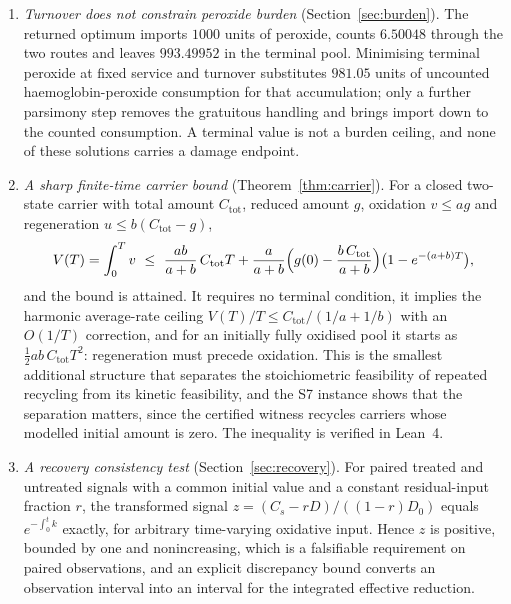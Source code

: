 \documentclass[11pt,a4paper]{article}
\theoremstyle{plain}
\theoremstyle{definition}
\theoremstyle{remark}
\newcommand{\Ctot}{C_{\mathrm{tot}}}
\begin{document}
\begin{enumerate}[label=(\roman*)]
\item \emph{Turnover does not constrain peroxide burden}
(Section~\ref{sec:burden}). The returned optimum imports $1000$ units of
peroxide, counts $6.50048$ through the two routes and leaves $993.49952$ in the
terminal pool. Minimising terminal peroxide at fixed service and turnover
substitutes $981.05$ units of uncounted haemoglobin-peroxide consumption for
that accumulation; only a further parsimony step removes the gratuitous
handling and brings import down to the counted consumption. A terminal value is
not a burden ceiling, and none of these solutions carries a damage endpoint.

\item \emph{A sharp finite-time carrier bound} (Theorem~\ref{thm:carrier}).
For a closed two-state carrier with total amount $\Ctot$, reduced amount $g$,
oxidation $v\le ag$ and regeneration $u\le b(\Ctot-g)$,
\[
V(T)=\int_0^T v\ \le\ \frac{ab}{a+b}\,\Ctot T
+\frac{a}{a+b}\Bigl(g(0)-\frac{b\,\Ctot}{a+b}\Bigr)\bigl(1-e^{-(a+b)T}\bigr),
\]
and the bound is attained. It requires no terminal condition, it implies the
harmonic average-rate ceiling $V(T)/T\le \Ctot/(1/a+1/b)$ with an $O(1/T)$
correction, and for an initially fully oxidised pool it starts as
$\tfrac12ab\,\Ctot T^2$: regeneration must precede oxidation. This is the
smallest additional structure that separates the stoichiometric feasibility of
repeated recycling from its kinetic feasibility, and the S7 instance shows that
the separation matters, since the certified witness recycles carriers whose
modelled initial amount is zero. The inequality is verified in Lean~4.

\item \emph{A recovery consistency test} (Section~\ref{sec:recovery}). For
paired treated and untreated signals with a common initial value and a constant
residual-input fraction $r$, the transformed signal
$z=(C_s-rD)/((1-r)D_0)$ equals $e^{-\int_0^tk}$ exactly, for arbitrary
time-varying oxidative input. Hence $z$ is positive, bounded by one and
nonincreasing, which is a falsifiable requirement on paired observations, and
an explicit discrepancy bound converts an observation interval into an interval
for the integrated effective reduction.
\end{enumerate}
\end{document}
